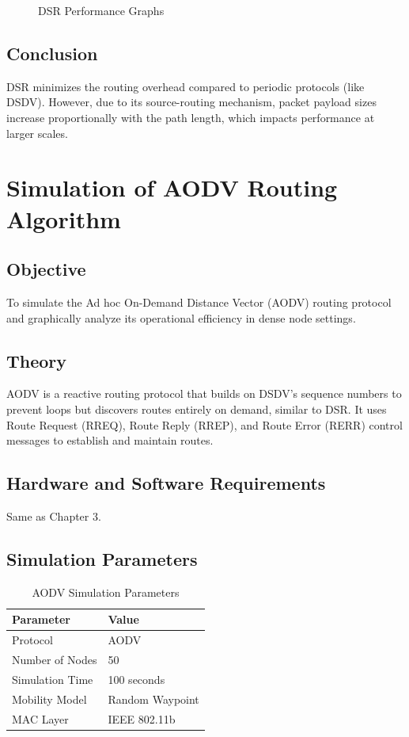 \documentclass[12pt,a4paper]{report}
\begin{document}
\begin{figure}[H]
    \centering
    \caption{DSR Performance Graphs}
\end{figure}

\section{Conclusion}
DSR minimizes the routing overhead compared to periodic protocols (like DSDV). However, due to its source-routing mechanism, packet payload sizes increase proportionally with the path length, which impacts performance at larger scales.

\chapter{Simulation of AODV Routing Algorithm}

\section{Objective}
To simulate the Ad hoc On-Demand Distance Vector (AODV) routing protocol and graphically analyze its operational efficiency in dense node settings.

\section{Theory}
AODV is a reactive routing protocol that builds on DSDV's sequence numbers to prevent loops but discovers routes entirely on demand, similar to DSR. It uses Route Request (RREQ), Route Reply (RREP), and Route Error (RERR) control messages to establish and maintain routes.

\section{Hardware and Software Requirements}
Same as Chapter 3.

\section{Simulation Parameters}
\begin{table}[H]
    \centering
    \caption{AODV Simulation Parameters}
    \begin{tabular}{@{}ll@{}}
    \toprule
    \textbf{Parameter} & \textbf{Value} \\ \midrule
    Protocol & AODV \\
    Number of Nodes & 50 \\
    Simulation Time & 100 seconds \\
    Mobility Model & Random Waypoint \\
    MAC Layer & IEEE 802.11b \\ \bottomrule
    \end{tabular}
\end{table}
\end{document}
